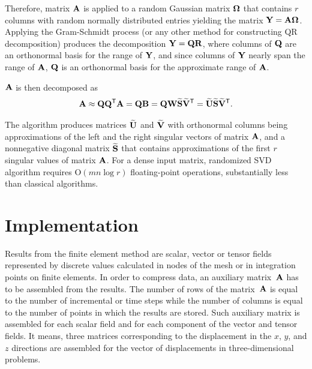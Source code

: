 Therefore, matrix $\mathbf{A}$ is applied to a random Gaussian matrix $\mathbf{\Omega}$ that contains $r$ columns with random normally distributed entries yielding the matrix $\mathbf{Y} = \mathbf{A} \mathbf{\Omega}$. Applying the Gram-Schmidt process (or any other method for constructing QR decomposition) produces the decomposition $\mathbf{Y}=\mathbf{Q}\mathbf{R}$, where columns of $\mathbf{Q}$ are an orthonormal basis for the range of $\mathbf{Y}$, and since columns of $\mathbf{Y}$ nearly span the range of $\mathbf{A}$, $\mathbf{Q}$ is an orthonormal basis for the approximate range of $\mathbf{A}$.

$\mathbf{A}$ is then decomposed as
\begin{equation}
\mathbf{A} \approx \mathbf{Q}\mathbf{Q}^{\mathsf{T}}\mathbf{A} = \mathbf{Q}\mathbf{B} = \mathbf{Q}\mathbf{W}\mathbf{\widetilde{S}}\mathbf{\widetilde{V}}^{\mathsf{T}} = \mathbf{\widetilde{U}}\mathbf{\widetilde{S}}\mathbf{\widetilde{V}}^{\mathsf{T}}.
\end{equation}

\noindent
The algorithm produces matrices $\mathbf{\widetilde{U}}$ and $\mathbf{\widetilde{V}}$ with orthonormal columns being approximations of the left and the right singular vectors of matrix $\mathbf{A}$, and a nonnegative diagonal matrix $\mathbf{\widetilde{S}}$ that contains approximations of the first $r$ singular values of matrix $\mathbf{A}$. For a dense input matrix, randomized SVD algorithm requires $\mathrm{O}(mn \log{r})$ floating-point operations, substantially less than classical algorithms.



\section{Implementation}


Results from the finite element method are scalar, vector or tensor fields represented by discrete values calculated in nodes of the mesh or in integration points on finite elements. In order to compress data, an auxiliary matrix~$\mathbf{A}$ has to be assembled from the results. The number of rows of the matrix~$\mathbf{A}$ is equal to the number of incremental or time steps while the number of columns is equal to the number of points in which the results are stored. Such auxiliary matrix is assembled for each scalar field and for each component of the vector and tensor fields. It means, three matrices corresponding to the displacement in the $x$, $y$, and $z$ directions are assembled for the vector of displacements in three-dimensional problems.

